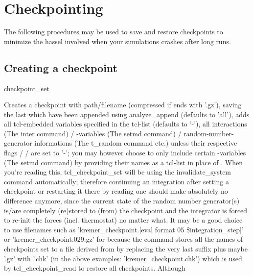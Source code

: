 \section{Checkpointing}

The following procedures may be used to save and restore checkpoints
to minimize the hassel involved when your simulations crashes after
long runs.

\subsection{Creating a checkpoint}

\begin{essyntax}
  checkpoint_set  
\end{essyntax}
Creates a checkpoint with path/filename  (compressed
if  ends with '.gz'), saving the last  which have been appended using analyze\_append (defaults to
'all'), adds all tcl-embedded variables specified in the tcl-list
 (defaults to '-'), all interactions (The inter command) /
\es{}-variables (The setmd command) / random-number-generator
informations (The t\_random command etc.) unless their respective
flags  /  /  are set to '-'; you
may however choose to only include certain \es-variables (The setmd
command) by providing their names as a tcl-list in place of
.  When you're reading this, tcl\_checkpoint\_set will be
using the invalidate\_system command automatically; therefore
continuing an integration after setting a checkpoint or restarting it
there by reading one should make absolutely no difference anymore,
since the current state of the random number generator(s) is/are
completely (re)stored to (from) the checkpoint and the integrator is
forced to re-init the forces (incl. thermostat) no matter what.  It
may be a good choice to use filenames such as
'kremer\_checkpoint.[eval format 05 \$integration\_step]' or
'kremer\_checkpoint.029.gz' for  because the command
stores all the names of checkpoints set to a file derived from
 by replacing the very last suffix plus maybe '.gz'
with '.chk' (in the above examples: 'kremer\_checkpoint.chk') which is
used by tcl\_checkpoint\_read to restore all checkpoints.  Although
